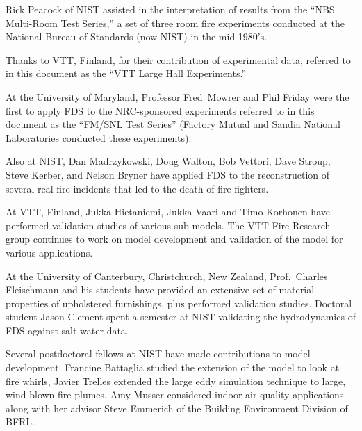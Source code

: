 \documentclass[11pt]{book}
\begin{document}
Rick Peacock of NIST assisted in the interpretation of results from
the ``NBS Multi-Room Test Series,'' a set of three room
fire experiments conducted at the National Bureau of Standards (now
NIST) in the mid-1980's.

Thanks to VTT, Finland, for their contribution of experimental data,
referred to in this document as the ``VTT Large Hall Experiments.''

At the University of Maryland, Professor Fred~Mowrer and Phil Friday
were the first to apply FDS to the NRC-sponsored experiments referred
to in this document as the ``FM/SNL Test Series'' (Factory Mutual and
Sandia National Laboratories conducted these experiments).

Also at NIST, Dan Madrzykowski, Doug Walton, Bob Vettori, Dave Stroup,
Steve Kerber, and Nelson Bryner have applied FDS to the reconstruction
of several real fire incidents that led to the death of fire fighters.

At VTT, Finland, Jukka Hietaniemi, Jukka Vaari and Timo Korhonen have
performed validation studies of various sub-models. The VTT Fire
Research group continues to work on model development and
validation of the model for various applications.

At the University of Canterbury, Christchurch, New Zealand,
Prof.~Charles Fleischmann and his students have provided an extensive
set of material properties of upholstered furnishings, plus performed
validation studies. Doctoral student Jason Clement spent a semester at
NIST validating the hydrodynamics of FDS against salt water data.

Several postdoctoral fellows at NIST have made contributions to model
development. Francine Battaglia studied the extension of the model to
look at fire whirls, Javier Trelles extended the large eddy simulation
technique to large, wind-blown fire plumes, Amy Musser considered
indoor air quality applications along with her advisor Steve Emmerich
of the Building Environment Division of BFRL.




\tableofcontents

\mainmatter



%
%
%
%
%
%
%
%
%
%
%

\backmatter




\appendix

%
%
%
%
%
%

\end{document}
